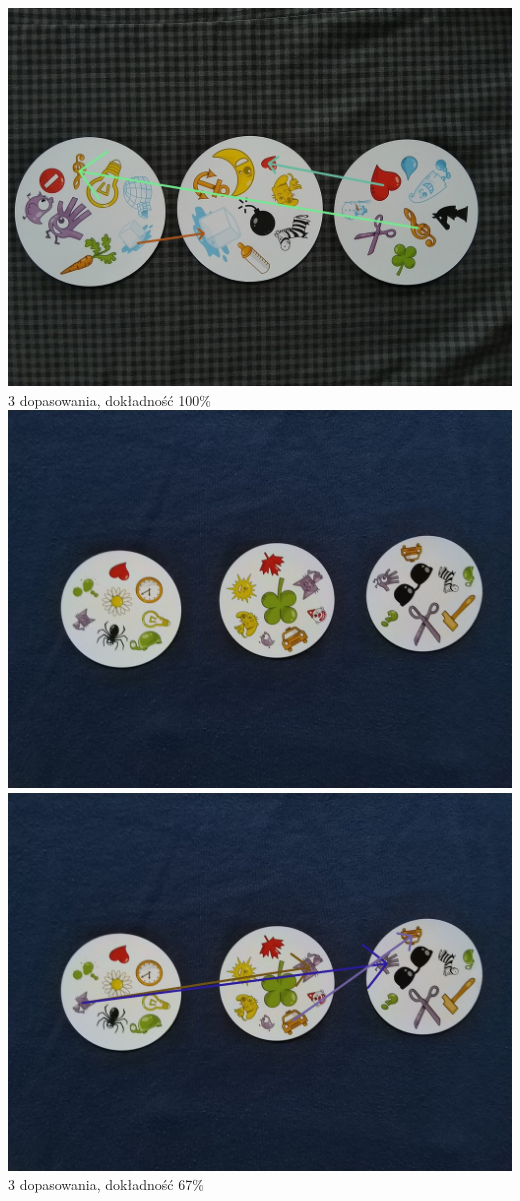 \documentclass[10pt,a4paper]{article}
\begin{document}
\begin{center}
\includegraphics[scale=0.28]{medium/img_arrows8.jpg}\\
3 dopasowania, dokładność 100\%
\includegraphics[scale=0.28]{medium/dobble26.jpg}
\includegraphics[scale=0.28]{medium/img_arrows9.jpg}\\
3 dopasowania, dokładność 67\%
\end{center}
\end{document}
